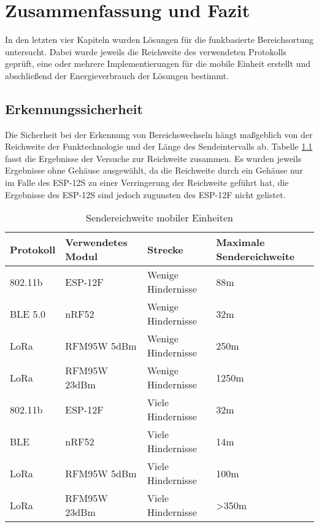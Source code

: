 \chapter{Zusammenfassung und Fazit}
\label{ch:fazit}
In den letzten vier Kapiteln wurden Lösungen für die funkbasierte Bereichsortung untersucht.
Dabei wurde jeweils die Reichweite des verwendeten Protokolls geprüft, eine oder mehrere Implementierungen für die mobile Einheit erstellt und abschließend der Energieverbrauch der Lösungen bestimmt. \\

\section{Erkennungssicherheit}
Die Sicherheit bei der Erkennung von Bereichswechseln hängt maßgeblich von der Reichweite der Funktechnologie und der Länge des Sendeintervalls ab.
Tabelle \ref{table:ranges} fasst die Ergebnisse der Versuche zur Reichweite zusammen. 
Es wurden jeweils Ergebnisse ohne Gehäuse ausgewählt, da die Reichweite durch ein Gehäuse nur im Falle des ESP-12S zu einer Verringerung der Reichweite geführt hat, die Ergebnisse des ESP-12S sind jedoch zugunsten des ESP-12F nicht gelistet.

\begin{table}[h]
	\centering
	\caption{Sendereichweite mobiler Einheiten}
	\label{table:ranges}
	\begin{tabular}{p{2cm}|p{3.5cm}|p{3.5cm}|p{3cm}}
		Protokoll & Verwendetes Modul & Strecke & Maximale Sendereichweite \\
		\hline
		802.11b & ESP-12F & Wenige Hindernisse & 88m \\
		BLE 5.0 & nRF52 & Wenige Hindernisse & 32m \\
		LoRa & RFM95W 5dBm & Wenige Hindernisse & 250m \\
		LoRa & RFM95W 23dBm & Wenige Hindernisse & 1250m \\
		\hline
		802.11b & ESP-12F  & Viele Hindernisse & 32m \\
		BLE & nRF52  & Viele Hindernisse & 14m \\
		LoRa & RFM95W 5dBm & Viele Hindernisse & 100m \\
		LoRa & RFM95W 23dBm & Viele Hindernisse & >350m \\
	\end{tabular}
\end{table}

